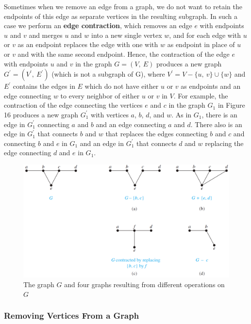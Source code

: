 \documentclass[11pt]{article}
\begin{document}
Sometimes when we remove an edge from a graph, we do not want to retain the endpoints of this edge as separate vertices in the resulting subgraph. In such a case we perform an \textbf{edge contraction}, which removes an edge $e$ with endpoints $u$ and $v$ and merges $u$ and $w$ into a new single vertex $w$, and for each edge with $u$ or $v$ as an endpoint replaces the edge with one with $w$ as endpoint in place of $u$ or $v$ and with the same second endpoint. 
Hence, the contraction of the edge $e$ with endpoints $u$ and $v$ in the graph $G = (V,\ E)$ produces a new graph $G^{'} = (V^{'},\ E^{'})$ (which is not a subgraph of G), where $V^{'} = V - \{u,\ v\} \cup \{w\}$ and $E^{'}$ contains the edges in $E$ which do not have either $u$ or $v$ as endpoints and an edge connecting $w$ to every neighbor of either $u$ or $v$ in $V$. For example, the contraction of the edge connecting the vertices $e$ and $c$ in the graph $G_1$ in Figure 16 produces a new graph $G^{'}_1$ with vertices $a$, $b$, $d$, and $w$. As in $G_1$, there is an edge in $G^{'}_1$ connecting $a$ and $b$ and an edge connecting $a$ and $d$. There also is an edge in $G^{'}_1$ that connects $b$ and $w$ that replaces the edges connecting $b$ and $c$ and connecting $b$ and $e$ in $G_1$ and an edge in $G^{'}_1$ that connects $d$ and $w$ replacing the edge connecting $d$ and $e$ in $G_1$.

\setcounter{figure}{15}
\begin{figure}[h!]
    \centering
    \includegraphics[width=\textwidth]{img/ch10.2-figure16.png}
    \caption{The graph $G$ and four graphs resulting from different operations on $G$}
    \label{fig:my_label}
\end{figure}

\subsubsection{Removing Vertices From a Graph}
\end{document}
